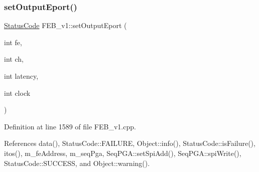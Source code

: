 \subsubsection{\texorpdfstring{set\+Output\+Eport()}{setOutputEport()}\hspace{0.1cm}{\footnotesize\ttfamily [2/2]}}
{\footnotesize\ttfamily \hyperlink{classStatusCode}{Status\+Code} F\+E\+B\+\_\+v1\+::set\+Output\+Eport (\begin{DoxyParamCaption}\item[{int}]{fe,  }\item[{int}]{ch,  }\item[{int}]{latency,  }\item[{int}]{clock }\end{DoxyParamCaption})}



Definition at line 1589 of file F\+E\+B\+\_\+v1.\+cpp.



References data(), Status\+Code\+::\+F\+A\+I\+L\+U\+RE, Object\+::info(), Status\+Code\+::is\+Failure(), itos(), m\+\_\+fe\+Address, m\+\_\+seq\+Pga, Seq\+P\+G\+A\+::set\+Spi\+Add(), Seq\+P\+G\+A\+::spi\+Write(), Status\+Code\+::\+S\+U\+C\+C\+E\+SS, and Object\+::warning().


